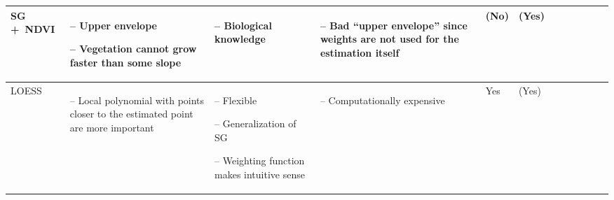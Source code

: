 \begin{table}[!ht]
\begin{tabular}{p{1.6cm}p{3.3cm}p{3.3cm}p{3.4cm}p{0.4cm}p{0.4cm}p{3cm}p{3cm}p{3cm}p{3cm}p{2.7cm}p{3cm}|}
		SG +~NDVI                                                                                                                                                    &
		\begin{cptitemize} \item[--]  Upper envelope \item[--]  Vegetation cannot grow faster than some slope                                \end{cptitemize}        &
		\begin{cptitemize} \item[--]  Biological knowledge                                                                            \end{cptitemize}               &
		\begin{cptitemize} \item[--]  Bad ``upper envelope'' since weights are not used for the estimation itself                    \end{cptitemize}               &
		(No)                                                                                                                                                         &
		(Yes)                                                                                                                                                         \\ \hline%

		LOESS                                                                                                                                                        &
		\begin{cptitemize} \item[--]  Local  polynomial with points closer to the estimated point are more important                  \end{cptitemize}               &
		\begin{cptitemize} \item[--]  Flexible \item[--]  Generalization of SG \item[--]  Weighting function makes intuitive sense                  \end{cptitemize} &
		\begin{cptitemize} \item[--]  Computationally expensive                                                                       \end{cptitemize}               &
		Yes                                                                                                                                                          &
		(Yes)                                                                                                                                                         \\ \hline%


\end{tabular}
\end{table}
